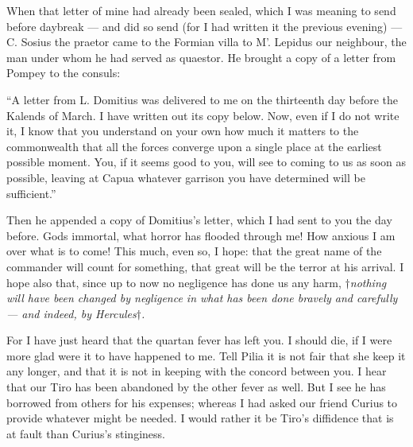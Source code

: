 

 When that letter of mine had already been sealed, which I was meaning to send before daybreak --- and did so send (for I had written it the previous evening) --- C. Sosius the praetor came to the Formian villa to M'. Lepidus our neighbour, the man under whom he had served as quaestor. He brought a copy of a letter from Pompey to the consuls:

 ``A letter from L. Domitius was delivered to me on the thirteenth day before the Kalends of March. I have written out its copy below. Now, even if I do not write it, I know that you understand on your own how much it matters to the commonwealth that all the forces converge upon a single place at the earliest possible moment. You, if it seems good to you, will see to coming to us as soon as possible, leaving at Capua whatever garrison you have determined will be sufficient.''

 Then he appended a copy of Domitius's letter, which I had sent to you the day before. Gods immortal, what horror has flooded through me! How anxious I am over what is to come! This much, even so, I hope: that the great name of the commander will count for something, that great will be the terror at his arrival. I hope also that, since up to now no negligence has done us any harm, \textit{$\dagger$nothing will have been changed by negligence in what has been done bravely and carefully --- and indeed, by Hercules$\dagger$.}

 For I have just heard that the quartan fever has left you. I should die, if I were more glad were it to have happened to me. Tell Pilia it is not fair that she keep it any longer, and that it is not in keeping with the concord between you. I hear that our Tiro has been abandoned by the other fever as well. But I see he has borrowed from others for his expenses; whereas I had asked our friend Curius to provide whatever might be needed. I would rather it be Tiro's diffidence that is at fault than Curius's stinginess.

